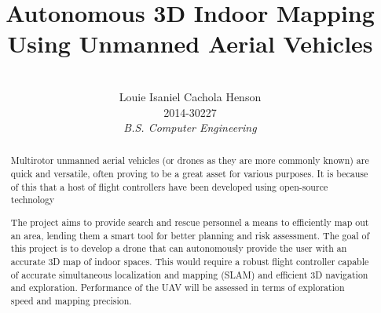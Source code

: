 \documentclass[english]{upeeei}
\begin{document}
\title{Autonomous 3D Indoor Mapping Using Unmanned Aerial Vehicles} 


\author{
\\Louie Isaniel Cachola Henson \\ 2014-30227 \\ \emph{B.S. Computer Engineering}
}




\maketitle
\begin{abstract} 



Multirotor unmanned aerial vehicles (or drones as they are more commonly known) are quick and versatile, often 
proving to be a great asset for various purposes. It is because of this that a host of flight controllers
have been developed using open-source technology

The project aims to provide search and rescue
personnel a means to efficiently map out an area, lending them a smart tool for better planning and risk assessment.
The goal of this project is to develop a drone that can autonomously provide the user with an
accurate 3D map of indoor spaces. This would require a robust flight controller capable of
accurate simultaneous localization and mapping (SLAM) and efficient 3D navigation and exploration. Performance of the UAV
will be assessed in terms of exploration speed and mapping precision.

\end{abstract}
\end{document}
